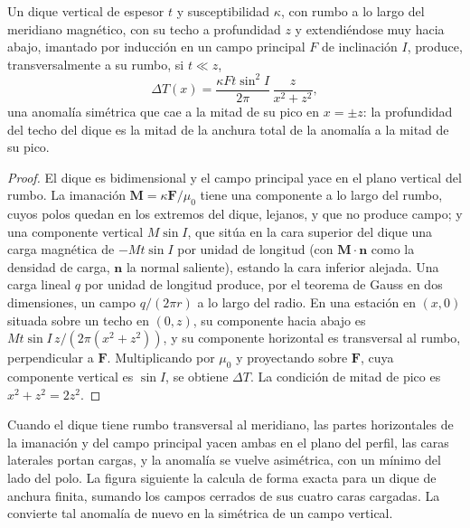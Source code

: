 \begin{proposition}\label{prop:b3:field-lab-methods-3:dyke}
Un dique vertical de espesor $t$ y susceptibilidad $\kappa$, con rumbo
a lo largo del meridiano magnético, con su techo a profundidad $z$ y extendiéndose
muy hacia abajo, imantado por inducción en un campo principal $F$ de inclinación $I$,
produce, transversalmente a su rumbo, si $t \ll z$,
\[
\Delta T(x) = \frac{\kappa F t\sin^2 I}{2\pi}\,\frac{z}{x^2 + z^2} ,
\]
una anomalía simétrica que cae a la mitad de su pico en $x = \pm z$: la
profundidad del techo del dique es la mitad de la anchura total de la anomalía a
la mitad de su pico.
\end{proposition}

\begin{proof}
El dique es bidimensional y el campo principal yace en el plano vertical
del rumbo. La imanación $\mathbf{M} = \kappa\mathbf{F}/\mu_0$
tiene una componente a lo largo del rumbo, cuyos polos quedan en los extremos del
dique, lejanos, y que no produce campo; y una componente vertical $M
\sin I$, que sitúa en la cara superior del dique una carga magnética de
$-Mt\sin I$ por unidad de longitud (con $\mathbf{M}\cdot\mathbf{n}$ como la
densidad de carga, $\mathbf{n}$ la normal saliente), estando la cara inferior
alejada. Una carga lineal $q$ por unidad de longitud produce, por el teorema de Gauss
en dos dimensiones, un campo $q/(2\pi r)$ a lo largo del radio. En una
estación en $(x, 0)$ situada sobre un techo en $(0, z)$, su componente hacia abajo es
$Mt\sin I\,z/(2\pi(x^2 + z^2))$, y su componente horizontal es
transversal al rumbo, perpendicular a $\mathbf{F}$. Multiplicando por
$\mu_0$ y proyectando sobre $\mathbf{F}$, cuya componente vertical es
$\sin I$, se obtiene $\Delta T$. La condición de mitad de pico es $x^2 + z^2 =
2z^2$.
\end{proof}

Cuando el dique tiene rumbo transversal al meridiano, las partes horizontales de la
imanación y del campo principal yacen ambas en el plano del
perfil, las caras laterales portan cargas, y la anomalía se vuelve
asimétrica, con un mínimo del lado del polo. La figura siguiente
la calcula de forma exacta para un dique de anchura finita, sumando los campos cerrados
de sus cuatro caras cargadas. La  convierte tal
anomalía de nuevo en la simétrica de un campo vertical.

